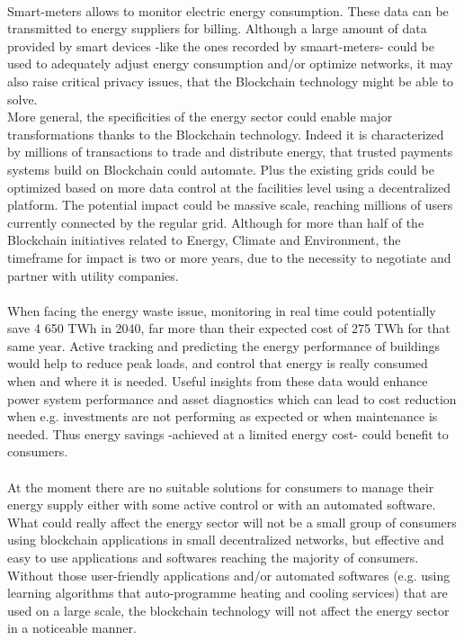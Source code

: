 \documentclass[11pt]{article}
\begin{document}
\\
Smart-meters allows to monitor electric energy consumption. These data can be transmitted to energy suppliers for billing. Although a large amount of data provided by smart devices -like the ones recorded by smaart-meters- could be used to adequately adjust energy consumption and/or optimize networks, it may also raise critical privacy issues,\cite{4} that the Blockchain technology might be able to solve.\\
More general, the specificities of the energy sector could enable major transformations thanks to the Blockchain technology. Indeed it is characterized by millions of transactions to trade and distribute energy, that trusted payments systems build on Blockchain could automate. Plus the existing grids could be optimized based on more data control at the facilities level using a decentralized platform. The potential impact could be massive scale, reaching millions of users currently connected by the regular grid. Although for more than half of the Blockchain initiatives related to Energy, Climate and Environment, the timeframe for impact is two or more years, due to the necessity to negotiate and partner with utility companies.\cite{5}\\\\
When facing the energy waste issue, monitoring in real time could potentially save 4 650 TWh in 2040, far more than their expected cost of 275 TWh for that same year. Active tracking and predicting the energy performance of buildings would help to reduce peak loads, and control that energy is really consumed when and where it is needed. Useful insights from these data would enhance power system performance and asset diagnostics which can lead to cost reduction when e.g. investments are not performing as expected or when maintenance is needed. Thus energy savings -achieved at a limited energy cost- could benefit to consumers.\cite{6}\\\\
At the moment there are no suitable solutions for consumers to manage their energy supply either with some active control or with an automated software. What could really affect the energy sector will not be a small group of consumers using blockchain applications in small decentralized networks, but effective and easy to use applications and softwares reaching the majority of consumers. Without those user-friendly applications and/or automated softwares (e.g. using learning algorithms that auto-programme heating and cooling services) that are used on a large scale, the blockchain technology will not affect the energy sector in a noticeable manner.\cite{7}\\\\
\end{document}
